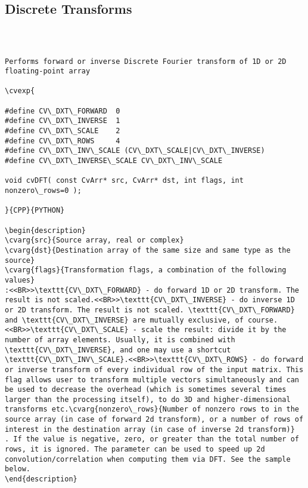 \subsection{Discrete Transforms}
\begin{verbatim}


\end{verbatim}
\label{DFT}
\begin{verbatim}

Performs forward or inverse Discrete Fourier transform of 1D or 2D floating-point array

\cvexp{

#define CV\_DXT\_FORWARD  0
#define CV\_DXT\_INVERSE  1
#define CV\_DXT\_SCALE    2
#define CV\_DXT\_ROWS     4
#define CV\_DXT\_INV\_SCALE (CV\_DXT\_SCALE|CV\_DXT\_INVERSE)
#define CV\_DXT\_INVERSE\_SCALE CV\_DXT\_INV\_SCALE

void cvDFT( const CvArr* src, CvArr* dst, int flags, int nonzero\_rows=0 );

}{CPP}{PYTHON}

\begin{description}
\cvarg{src}{Source array, real or complex}
\cvarg{dst}{Destination array of the same size and same type as the source}
\cvarg{flags}{Transformation flags, a combination of the following values}
:<<BR>>\texttt{CV\_DXT\_FORWARD} - do forward 1D or 2D transform. The result is not scaled.<<BR>>\texttt{CV\_DXT\_INVERSE} - do inverse 1D or 2D transform. The result is not scaled. \texttt{CV\_DXT\_FORWARD} and \texttt{CV\_DXT\_INVERSE} are mutually exclusive, of course.<<BR>>\texttt{CV\_DXT\_SCALE} - scale the result: divide it by the number of array elements. Usually, it is combined with \texttt{CV\_DXT\_INVERSE}, and one may use a shortcut \texttt{CV\_DXT\_INV\_SCALE}.<<BR>>\texttt{CV\_DXT\_ROWS} - do forward or inverse transform of every individual row of the input matrix. This flag allows user to transform multiple vectors simultaneously and can be used to decrease the overhead (which is sometimes several times larger than the processing itself), to do 3D and higher-dimensional transforms etc.\cvarg{nonzero\_rows}{Number of nonzero rows to in the source array (in case of forward 2d transform), or a number of rows of interest in the destination array (in case of inverse 2d transform)}
. If the value is negative, zero, or greater than the total number of rows, it is ignored. The parameter can be used to speed up 2d convolution/correlation when computing them via DFT. See the sample below.
\end{description}


\end{verbatim}
